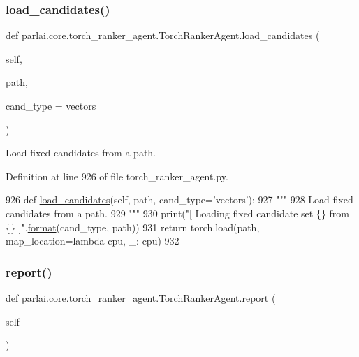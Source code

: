 \subsubsection{\texorpdfstring{load\+\_\+candidates()}{load\_candidates()}}
{\footnotesize\ttfamily def parlai.\+core.\+torch\+\_\+ranker\+\_\+agent.\+Torch\+Ranker\+Agent.\+load\+\_\+candidates (\begin{DoxyParamCaption}\item[{}]{self,  }\item[{}]{path,  }\item[{}]{cand\+\_\+type = {\ttfamily \textquotesingle{}vectors\textquotesingle{}} }\end{DoxyParamCaption})}

\begin{DoxyVerb}Load fixed candidates from a path.
\end{DoxyVerb}
 

Definition at line 926 of file torch\+\_\+ranker\+\_\+agent.\+py.


\begin{DoxyCode}
926     \textcolor{keyword}{def }\hyperlink{namespaceparlai_1_1tasks_1_1coco__caption_1_1agents_aa190162d0e36e1c93fc224b8a049f0cf}{load\_candidates}(self, path, cand\_type='vectors'):
927         \textcolor{stringliteral}{"""}
928 \textcolor{stringliteral}{        Load fixed candidates from a path.}
929 \textcolor{stringliteral}{        """}
930         print(\textcolor{stringliteral}{"[ Loading fixed candidate set \{\} from \{\} ]"}.\hyperlink{namespaceparlai_1_1chat__service_1_1services_1_1messenger_1_1shared__utils_a32e2e2022b824fbaf80c747160b52a76}{format}(cand\_type, path))
931         \textcolor{keywordflow}{return} torch.load(path, map\_location=\textcolor{keyword}{lambda} cpu, \_: cpu)
932 
\end{DoxyCode}
\mbox{\label{classparlai_1_1core_1_1torch__ranker__agent_1_1TorchRankerAgent_a6314748dfa9aaf6e26145af686d5787d}} 
\subsubsection{\texorpdfstring{report()}{report()}}
{\footnotesize\ttfamily def parlai.\+core.\+torch\+\_\+ranker\+\_\+agent.\+Torch\+Ranker\+Agent.\+report (\begin{DoxyParamCaption}\item[{}]{self }\end{DoxyParamCaption})}

